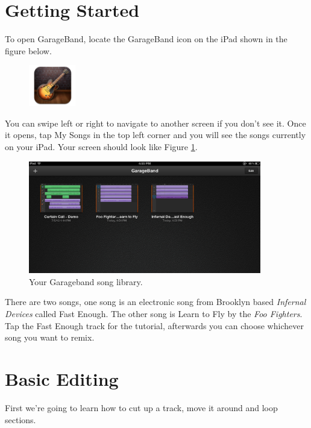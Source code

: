 \documentclass[12pt]{article}
\begin{document}
\section{Getting Started}
To open GarageBand, locate the GarageBand icon on the iPad shown in the figure below. 
\begin{figure}[h]
   \centering
   \includegraphics[width=0.8in]{fig/icon.jpg}
\end{figure}
You can swipe left or right to navigate to another screen if you don't see it. Once it opens, tap My Songs in the top left corner and you will see the songs currently on your iPad. Your screen should look like Figure \ref{fig:copy}. 
\begin{figure}[h]
   \centering
   \includegraphics[width=4in]{fig/main_screen.png}
   \caption{Your Garageband song library. \label{fig:copy}}
\end{figure}
There are two songs, one song is an electronic song from Brooklyn based \emph{Infernal Devices} called Fast Enough. The other song is Learn to Fly by the \emph{Foo Fighters}. Tap the Fast Enough track for the tutorial, afterwards you can choose whichever song you want to remix.

\section{Basic Editing}\label{sec:basic_editing}
First we're going to learn how to cut up a track, move it around and loop sections.
\end{document}
